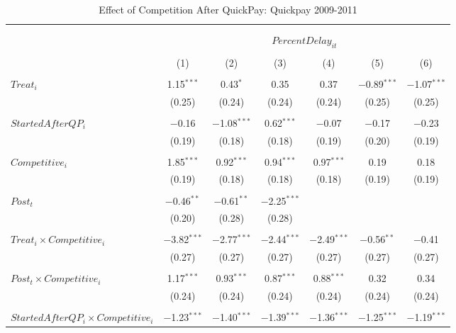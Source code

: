 \documentclass[
]{article}
\begin{document}
\begin{table}[H] \centering 
  \caption{Effect of Competition After QuickPay: Quickpay 2009-2011} 
  \label{} 
\small 
\begin{tabular}{@{\extracolsep{-3pt}}lcccccc} 
\\[-1.8ex]\hline 
\hline \\[-1.8ex] 
\\[-1.8ex] & \multicolumn{6}{c}{$PercentDelay_{it}$  } \\ 
\\[-1.8ex] & (1) & (2) & (3) & (4) & (5) & (6)\\ 
\hline \\[-1.8ex] 
 $Treat_i$ & 1.15$^{***}$ & 0.43$^{*}$ & 0.35 & 0.37 & $-$0.89$^{***}$ & $-$1.07$^{***}$ \\ 
  & (0.25) & (0.24) & (0.24) & (0.24) & (0.25) & (0.25) \\ 
  & & & & & & \\ 
 $StartedAfterQP_i$ & $-$0.16 & $-$1.08$^{***}$ & 0.62$^{***}$ & $-$0.07 & $-$0.17 & $-$0.23 \\ 
  & (0.19) & (0.18) & (0.18) & (0.19) & (0.20) & (0.19) \\ 
  & & & & & & \\ 
 $Competitive_i$ & 1.85$^{***}$ & 0.92$^{***}$ & 0.94$^{***}$ & 0.97$^{***}$ & 0.19 & 0.18 \\ 
  & (0.19) & (0.18) & (0.18) & (0.18) & (0.19) & (0.19) \\ 
  & & & & & & \\ 
 $Post_t$ & $-$0.46$^{**}$ & $-$0.61$^{**}$ & $-$2.25$^{***}$ &  &  &  \\ 
  & (0.20) & (0.28) & (0.28) &  &  &  \\ 
  & & & & & & \\ 
 $Treat_i \times Competitive_i$ & $-$3.82$^{***}$ & $-$2.77$^{***}$ & $-$2.44$^{***}$ & $-$2.49$^{***}$ & $-$0.56$^{**}$ & $-$0.41 \\ 
  & (0.27) & (0.27) & (0.27) & (0.27) & (0.27) & (0.27) \\ 
  & & & & & & \\ 
 $Post_t \times Competitive_i$ & 1.17$^{***}$ & 0.93$^{***}$ & 0.87$^{***}$ & 0.88$^{***}$ & 0.32 & 0.34 \\ 
  & (0.24) & (0.24) & (0.24) & (0.24) & (0.24) & (0.24) \\ 
  & & & & & & \\ 
 $StartedAfterQP_i \times Competitive_i$ & $-$1.23$^{***}$ & $-$1.40$^{***}$ & $-$1.39$^{***}$ & $-$1.36$^{***}$ & $-$1.25$^{***}$ & $-$1.19$^{***}$ \\ 

\end{tabular}
\end{table}
\end{document}
